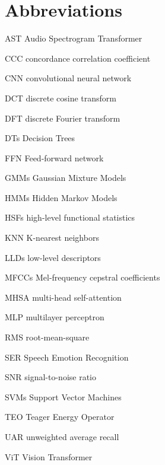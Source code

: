 
\chapter*{Abbreviations}

\begin{flushleft}

AST \hfill Audio Spectrogram Transformer

CCC \hfill concordance correlation coefficient

CNN \hfill convolutional neural network

DCT \hfill discrete cosine transform

DFT \hfill discrete Fourier transform

DTs \hfill Decision Trees

FFN \hfill Feed-forward network

GMMs \hfill Gaussian Mixture Models

HMMs \hfill Hidden Markov Models

HSFs \hfill high-level functional statistics

KNN \hfill K-nearest neighbors

LLDs \hfill low-level descriptors

MFCCs \hfill Mel-frequency cepstral coefficients

MHSA \hfill multi-head self-attention

MLP \hfill multilayer perceptron

RMS \hfill root-mean-square

SER \hfill Speech Emotion Recognition

SNR \hfill signal-to-noise ratio

SVMs \hfill Support Vector Machines

TEO \hfill Teager Energy Operator

UAR \hfill unweighted average recall

ViT \hfill Vision Transformer

\end{flushleft}